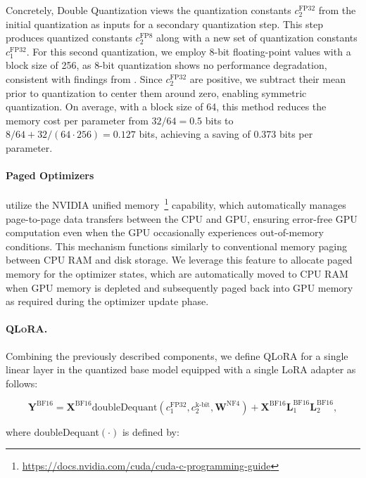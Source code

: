 Concretely, Double Quantization views the quantization constants $c_2^{\text{FP32}}$ from the initial quantization as inputs for a secondary quantization step. This step produces quantized constants $c_2^{\text{FP8}}$ along with a new set of quantization constants $c_1^{\text{FP32}}$. For this second quantization, we employ 8-bit floating-point values with a block size of 256, as 8-bit quantization shows no performance degradation, consistent with findings from \citet{dettmers2022case}. Since $c_2^{\text{FP32}}$ are positive, we subtract their mean prior to quantization to center them around zero, enabling symmetric quantization. On average, with a block size of 64, this method reduces the memory cost per parameter from $32/64=0.5$ bits to $8/64 + 32/(64\cdot256) = 0.127$ bits, achieving a saving of 0.373 bits per parameter.

\paragraph{Paged Optimizers} utilize the NVIDIA unified memory~\footnote{\tiny \url{https://docs.nvidia.com/cuda/cuda-c-programming-guide}} capability, which automatically manages page-to-page data transfers between the CPU and GPU, ensuring error-free GPU computation even when the GPU occasionally experiences out-of-memory conditions. This mechanism functions similarly to conventional memory paging between CPU RAM and disk storage. We leverage this feature to allocate paged memory for the optimizer states, which are automatically moved to CPU RAM when GPU memory is depleted and subsequently paged back into GPU memory as required during the optimizer update phase.

\paragraph{\textsc{QLoRA}.} Combining the previously described components, we define \textsc{QLoRA} for a single linear layer in the quantized base model equipped with a single LoRA adapter as follows:

\begin{equation}
    \mathbf{Y}^{\text{BF16}} =  \mathbf{X}^{\text{BF16}} \text{doubleDequant}(c_1^{\text{FP32}}, c_2^{\text{k-bit}}, \mathbf{W}^{\text{NF4}}) + \mathbf{X}^{\text{BF16}}\mathbf{L}^{\text{BF16}}_1\mathbf{L}^{\text{BF16}}_2,
\end{equation}

where doubleDequant$(\cdot)$ is defined by:

